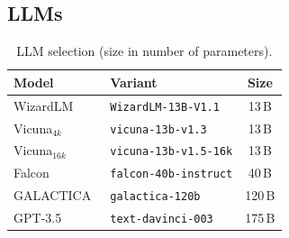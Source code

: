 


\subsection{LLMs}

\begin{table}[tb]
\centering
  \caption[LLM selection]{LLM selection (size in number of parameters).}
  \label{tab:llmselection}
  \begin{tabular}{llc}
    \hline
    Model & Variant & Size \\
    \hline
    WizardLM~\cite{xu2023wizardlm2023}
    & \texttt{WizardLM-13B-V1.1} & 13\,B \\
    Vicuna${}_{4k}$~\cite{vicuna2023}
    & \texttt{vicuna-13b-v1.3} & 13\,B \\
    Vicuna${}_{16k}$~\cite{vicuna2023}
    & \texttt{vicuna-13b-v1.5-16k} & 13\,B \\
    Falcon~\cite{falcon40b-huggingface}
    & \texttt{falcon-40b-instruct} & 40\,B \\
    GALACTICA~\cite{GALACTICA2022}
    & \texttt{galactica-120b} & 120\,B \\
    GPT-3.5~\cite{Brown2020gpt3}
    & \texttt{text-davinci-003} & 175\,B \\
    \hline
    \end{tabular}
\end{table}

